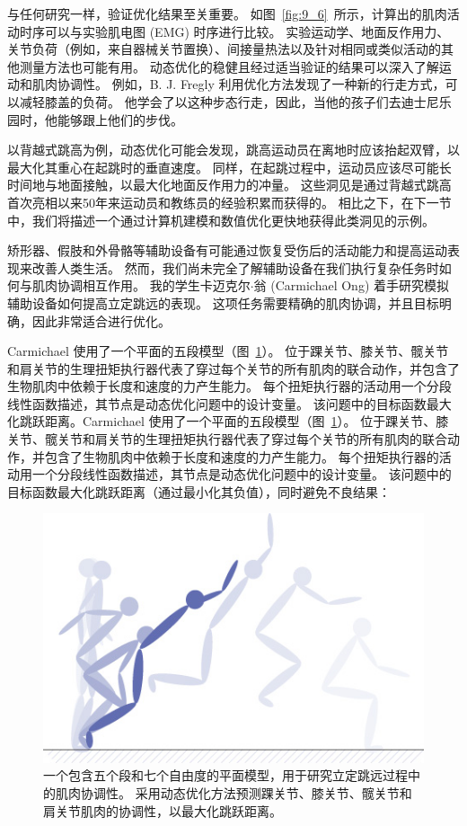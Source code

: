 与任何研究一样，验证优化结果至关重要。
如图~\ref{fig:9_6}~所示，计算出的肌肉活动时序可以与实验肌电图 (EMG) 时序进行比较。
实验运动学、地面反作用力、关节负荷（例如，来自器械关节置换）、间接量热法以及针对相同或类似活动的其他测量方法也可能有用。
动态优化的稳健且经过适当验证的结果可以深入了解运动和肌肉协调性。
例如，B. J. Fregly 利用优化方法发现了一种新的行走方式，可以减轻膝盖的负荷\cite{fregly2007design}。
他学会了以这种步态行走，因此，当他的孩子们去迪士尼乐园时，他能够跟上他们的步伐。


以背越式跳高为例，动态优化可能会发现，跳高运动员在离地时应该抬起双臂，以最大化其重心在起跳时的垂直速度。
同样，在起跳过程中，运动员应该尽可能长时间地与地面接触，以最大化地面反作用力的冲量。
这些洞见是通过背越式跳高首次亮相以来50年来运动员和教练员的经验积累而获得的。
相比之下，在下一节中，我们将描述一个通过计算机建模和数值优化更快地获得此类洞见的示例。




矫形器、假肢和外骨骼等辅助设备有可能通过恢复受伤后的活动能力和提高运动表现来改善人类生活。
然而，我们尚未完全了解辅助设备在我们执行复杂任务时如何与肌肉协调相互作用。
我的学生卡迈克尔$\cdot$翁 (Carmichael Ong) 着手研究模拟辅助设备如何提高立定跳远的表现。
这项任务需要精确的肌肉协调，并且目标明确，因此非常适合进行优化。


Carmichael 使用了一个平面的五段模型（图~\ref{fig:9_16}）。
位于踝关节、膝关节、髋关节和肩关节的生理扭矩执行器代表了穿过每个关节的所有肌肉的联合动作，并包含了生物肌肉中依赖于长度和速度的力产生能力。
每个扭矩执行器的活动用一个分段线性函数描述，其节点是动态优化问题中的设计变量。
该问题中的目标函数最大化跳跃距离。Carmichael 使用了一个平面的五段模型（图~\ref{fig:9_16}）。
位于踝关节、膝关节、髋关节和肩关节的生理扭矩执行器代表了穿过每个关节的所有肌肉的联合动作，并包含了生物肌肉中依赖于长度和速度的力产生能力。
每个扭矩执行器的活动用一个分段线性函数描述，其节点是动态优化问题中的设计变量。
该问题中的目标函数最大化跳跃距离（通过最小化其负值），同时避免不良结果：
%
\begin{figure}[!htb]
	\centering
	\includegraphics[width=0.8\linewidth]{chap9/9_16}
	\caption{一个包含五个段和七个自由度的平面模型，用于研究立定跳远过程中的肌肉协调性。
		采用动态优化方法预测踝关节、膝关节、髋关节和肩关节肌肉的协调性，以最大化跳跃距离\cite{ong2015simulation}。 \label{fig:9_16}}
\end{figure}



